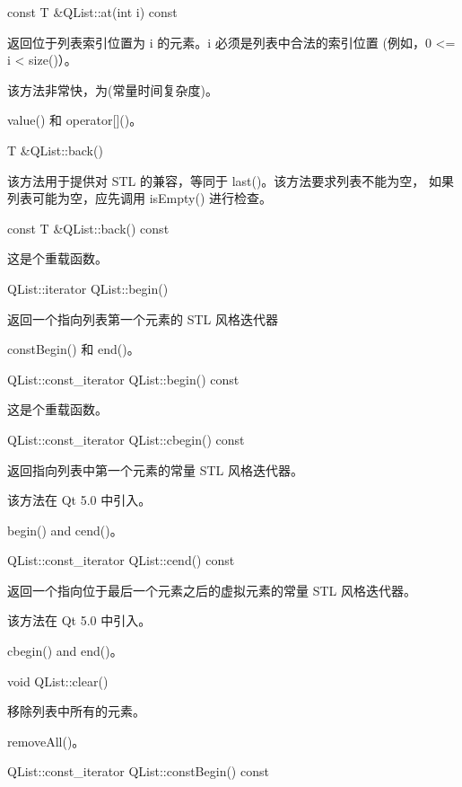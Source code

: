 const T \&QList::at(int i) const

返回位于列表索引位置为 i 的元素。i 必须是列表中合法的索引位置 (例如，0 <= i < size()）。

该方法非常快，为(常量时间复杂度)。



\begin{notice}[另请参阅]
value() 和 operator[]()。
\end{notice}



T \&QList::back()

该方法用于提供对 STL 的兼容，等同于 last()。该方法要求列表不能为空， 如果列表可能为空，应先调用 isEmpty() 进行检查。

const T \&QList::back() const

这是个重载函数。

QList::iterator QList::begin()

返回一个指向列表第一个元素的 STL 风格迭代器


\begin{notice}[另请参阅]
constBegin() 和 end()。
\end{notice}


QList::const\_iterator QList::begin() const

这是个重载函数。

QList::const\_iterator QList::cbegin() const

返回指向列表中第一个元素的常量 STL 风格迭代器。

该方法在 Qt 5.0 中引入。


\begin{notice}[另请参阅]
begin() and cend()。
\end{notice}


QList::const\_iterator QList::cend() const

返回一个指向位于最后一个元素之后的虚拟元素的常量 STL 风格迭代器。

该方法在 Qt 5.0 中引入。


\begin{notice}[另请参阅]
cbegin() and end()。
\end{notice}

void QList::clear()

移除列表中所有的元素。



\begin{notice}[另请参阅]
removeAll()。
\end{notice}


QList::const\_iterator QList::constBegin() const

